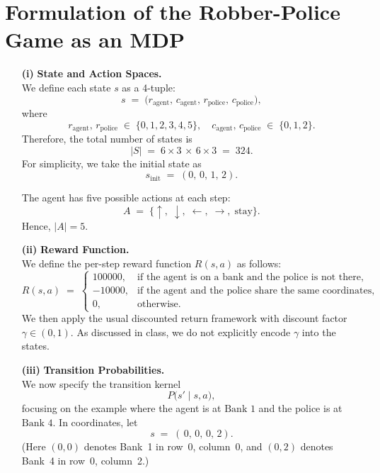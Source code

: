 \section*{Formulation of the Robber-Police Game as an MDP}

\begin{enumerate}

  \item[\textbf{(i)}]
    \textbf{State and Action Spaces.} \\
    We define each state \(s\) as a 4-tuple:
    \[
      s \;=\; \bigl(r_{\text{agent}},\,c_{\text{agent}},\,r_{\text{police}},\,c_{\text{police}}\bigr),
    \]
    where
    \[
      r_{\text{agent}},\,r_{\text{police}} \;\in\;\{0,1,2,3,4,5\},
      \quad
      c_{\text{agent}},\,c_{\text{police}} \;\in\;\{0,1,2\}.
    \]
    Therefore, the total number of states is
    \[
      |S| \;=\; 6 \times 3 \,\times\, 6 \times 3 \;=\; 324.
    \]
    For simplicity, we take the initial state as
    \[
      s_{\text{init}} \;=\; (0,\,0,\,1,\,2).
    \]

    The agent has five possible actions at each step:
    \[
      A \;=\; \{\uparrow,\;\downarrow,\;\leftarrow,\;\rightarrow,\;\text{stay}\}.
    \]
    Hence, \(\lvert A \rvert = 5\).

  \item[\textbf{(ii)}]
    \textbf{Reward Function.} \\
    We define the per-step reward function \(R(s,a)\) as follows:
    \[
      R(s, a) \;=\;
      \begin{cases}
        100000, & \text{if the agent is on a bank and the police is not there,} \\
        -10000, & \text{if the agent and the police share the same coordinates,} \\
        0, & \text{otherwise.}
      \end{cases}
    \]
    We then apply the usual discounted return framework with discount factor
    \(\gamma \in (0,1)\).  As discussed in class, we do not explicitly encode \(\gamma\) into the states.

  \item[\textbf{(iii)}]
    \textbf{Transition Probabilities.} \\
    We now specify the transition kernel
    \[
      P\bigl(s' \mid s, a\bigr),
    \]
    focusing on the example where the agent is at \(\text{Bank 1}\) and the police is at \(\text{Bank 4}\).  In coordinates, let
    \[
      s \;=\; (\,0,\,0,\,0,\,2).
    \]
    (Here \((0,0)\) denotes Bank~1 in row~0, column~0, and \((0,2)\) denotes Bank~4 in row~0, column~2.)


\end{enumerate}
